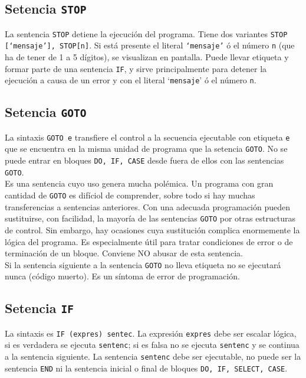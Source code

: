 \subsection{Setencia {\tt STOP}}

La sentencia {\tt STOP} detiene la ejecución del programa. Tiene dos variantes {\tt STOP [`mensaje'], STOP[n]}. Si está presente el literal {\tt `mensaje'} ó el número {\tt  n} (que ha de tener de 1 a 5 dígitos), se visualizan en pantalla. Puede llevar etiqueta y formar parte de una sentencia {\tt IF}, y sirve principalmente para detener la ejecución a causa de un error y con el literal `{\tt mensaje}' ó el número {\tt n}.

\subsection{Setencia {\tt GOTO}}

La sintaxis {\tt GOTO e} transfiere el control a la secuencia ejecutable con etiqueta {\tt e} que se encuentra en la misma unidad de programa que la setencia {\tt GOTO}. No se puede entrar en bloques {\tt DO, IF, CASE} desde fuera de ellos con las sentencias {\tt GOTO}. \\

Es una sentencia cuyo uso genera mucha polémica. Un programa con gran cantidad de {\tt GOTO} es difíciol de comprender, sobre todo si hay muchas transferencias a sentencias anteriores. Con una adecuada programación pueden sustituirse, con facilidad, la mayoría de las sentencias {\tt GOTO} por otras estructuras de control. Sin embargo, hay ocasiones cuya sustitución complica enormemente la lógica del programa. Es especialmente útil para tratar condiciones de error o de terminación de un bloque. Conviene NO abusar de esta sentencia. \\

Si la sentencia siguiente a la sentencia {\tt GOTO} no lleva etiqueta no se ejecutará nunca (código muerto). Es un síntoma de error de programación.

\subsection{Setencia {\tt IF}}

La sintaxis es {\tt IF (expres) sentec}. La expresión {\tt expres} debe ser escalar lógica, si es verdadera se ejecuta {\tt sentenc}; si es falsa no se ejecuta {\tt sentenc} y se continua a la sentencia siguiente. La sentencia {\tt sentenc} debe ser ejecutable, no puede ser la sentencia {\tt END} ni la sentencia inicial o final de bloques {\tt DO, IF, SELECT, CASE}. \\

